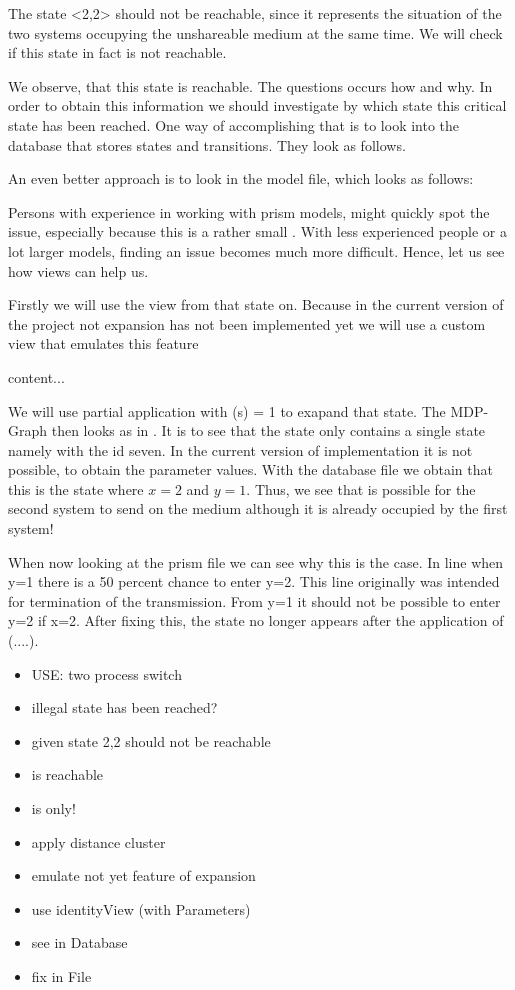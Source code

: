 \documentclass[preview]{standalone}
\begin{document}
The state <2,2> should not be reachable, since it represents the situation of the two systems occupying the unshareable medium at the same time. We will check if this state in fact is not reachable.

We observe, that this state is reachable. The questions occurs how and why. In order to obtain this information we should investigate by which state this critical state has been reached. One way of accomplishing that is to look into the database that stores states and transitions. They look as follows. 

An even better approach is to look in the model file, which looks as follows:

Persons with experience in working with prism models, might quickly spot the issue, especially because this is a rather small \mdp. With less experienced people or a lot larger models, finding an issue becomes much more difficult. Hence, let us see how views can help us.

Firstly we will use the view \viewdistance from that state on. Because in the current version of the project not expansion has not been implemented yet we will use a custom view that emulates this feature

\begin{definition}
	content...
\end{definition}

We will use partial application with \gfctdistance(s) = 1 to exapand that state. The MDP-Graph then looks as in . It is to see that the state only contains a single state namely with the id seven. In the current version of implementation it is not possible, to obtain the parameter values. With the database file we obtain that this is the state where $x=2$ and $y=1$. Thus, we see that is possible for the second system to send on the medium although it is already occupied by the first system!

When now looking at the prism file we can see why this is the case. In line when y=1 there is a 50 percent chance to enter y=2. This line originally was intended for termination of the transmission. From y=1 it should not be possible to enter y=2 if x=2. After fixing this, the state no longer appears after the application of \viewparamdnf(....).

	
	\begin{itemize}
		\item USE: two process switch 
		\item illegal state has been reached?
		\item given state 2,2 should not be reachable
		\item is reachable
		\item is only!
		\item apply distance cluster
		\item emulate not yet feature of expansion
		\item use identityView (with Parameters)
		\item see in Database
		\item fix in File
	\end{itemize}
\end{document}
